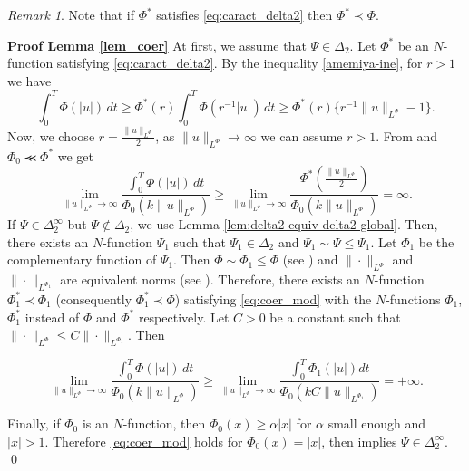 \documentclass[twoside]{article}
\theoremstyle{remark}
\newtheorem{comentario}{Remark}
\newcommand{\orlnor}{\|_{L^{\Phi}}}
\renewcommand{\leq}{\leqslant}
\renewcommand{\geq}{\geqslant}
\begin{document}
\begin{comentario} Note that if $\Phi^*$ satisfies \eqref{eq:caract_delta2} then $\Phi^*\prec \Phi$.
 \end{comentario}



\noindent\textbf{Proof Lemma \ref{lem_coer}} At first, we assume that $\Psi \in \Delta_2$. 
Let $\Phi^*$ be an $N$-function satisfying \eqref{eq:caract_delta2}. 
By the inequality \eqref{amemiya-ine}, for $r>1$ we have
\[
\int_0^T \Phi(|u|)\,dt\geq
\Phi^*(r) \int_0^T \Phi(r^{-1}|u|)\,dt\geq
\Phi^*(r)\{r^{-1}\|u\orlnor-1\}.
\]
Now, we choose $r=\frac{\|u\orlnor}{2}$, as $\|u\orlnor\to\infty$ we can assume $r>1$. 
From \cite[Thm. 2 (b)(v), p. 16]{rao1991theory} and $\Phi_0\llcurly \Phi^*$  we get
\begin{equation}\label{eq:caso-delta-2}
\lim\limits_{\|u\orlnor \to \infty} \frac{\int_0^T \Phi(|u|)\,dt}{\Phi_0(k\|u\orlnor)}\geq
\lim\limits_{\|u\orlnor \to \infty} \frac{\Phi^*\left(\frac{\|u\orlnor}{2}\right)}{\Phi_0(k\|u\orlnor)}
=\infty.
\end{equation}
 If $\Psi\in\Delta_2^{\infty}$ but $\Psi\notin\Delta_2$, we  use Lemma \ref{lem:delta2-equiv-delta2-global}. 
Then, there exists an $N$-function $\Psi_1$ such that $\Psi_1\in\Delta_2$ and  $\Psi_1\sim\Psi\leq \Psi_1$. 
Let $\Phi_1$ be the complementary function of $\Psi_1$. Then $\Phi\sim\Phi_1\leq \Phi$ (see \cite[Thm. 3.1]{KR}) and $\|\cdot\orlnor$ and $\|\cdot\|_{L^{\Phi_1}}$ are equivalent norms  (see \cite[Thm. 13.2 and Thm. 13.3]{KR}). Therefore, there exists an $N$-function $\Phi_1^*\prec \Phi_1$ (consequently $\Phi_1^*\prec \Phi$) satisfying  \eqref{eq:coer_mod}
with the $N$-functions $\Phi_1$,$\Phi_1^*$ instead of $\Phi$ and $\Phi^*$ respectively.
Let $C>0$ be a constant such that  $\|\cdot\orlnor\leq C\|\cdot\|_{L^{\Phi_1}}$. Then

\[\lim\limits_{\|u\orlnor \to \infty}\frac{\int_0^T \Phi(|u|)\,dt}{\Phi_0(k\|u\orlnor)}\geq \lim\limits_{\|u\orlnor \to \infty} \frac{\int_0^T \Phi_1(|u|)dt}{\Phi_0(kC\|u\|_{L^{\Phi_1}})}=+\infty.\]


Finally, if $\Phi_0$ is an $N$-function, then $\Phi_0(x)\geq \alpha |x|$ for  $\alpha$ small enough and $|x|>1$.
Therefore \eqref{eq:coer_mod} holds for $\Phi_0(x)=|x|$, then \cite[Lemma 5.2]{ABGMS2015}  
implies  $\Psi\in\Delta_2^{\infty}$. \qed
\end{document}
